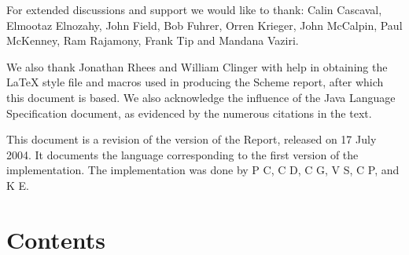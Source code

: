 For extended discussions and support we would like to thank: Calin
Cascaval, Elmootaz Elnozahy, John Field, Bob Fuhrer, Orren Krieger,
John McCalpin, Paul McKenney, Ram Rajamony, Frank Tip and Mandana
Vaziri.

We also thank Jonathan Rhees and William Clinger with help in
obtaining the \LaTeX{} style file and macros used in producing the
Scheme report, after which this document is based. We also acknowledge
the influence of the Java Language Specification \cite{jls2} document,
as evidenced by the numerous citations in the text.

This document is a revision of the {} version of the Report,
released on 17 July 2004. It documents the language corresponding to
the first version of the implementation.  The implementation was done
by P C, 
C D, 
C G, 
V S,
C P, and 
K E.




\vfill
\eject


\chapter*{Contents}
\addvspace{3.5pt}                  %
\renewcommand{\tocshrink}{-3.5pt}  %
{\footnotesize
\tableofcontents
}

\vfill
\eject


